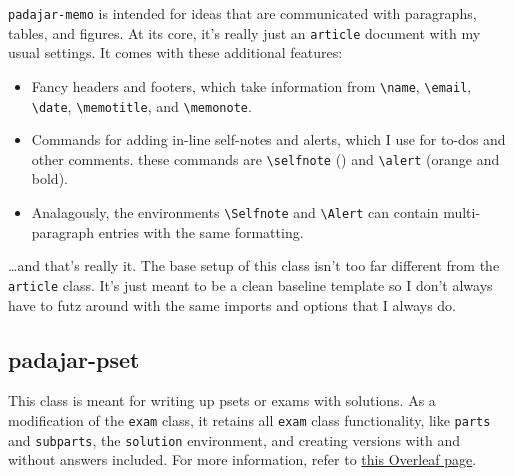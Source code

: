 \documentclass[11pt]{padajar-memo}
\newcommand{\ttslash}[1]{\texttt{\textbackslash #1}}
\begin{document}
\texttt{padajar-memo} is intended for ideas that are communicated with paragraphs, tables, and figures. At its core, it's really just an \texttt{article} document with my usual settings. It comes with these additional features:

\begin{itemize}
	\item Fancy headers and footers, which take information from \ttslash{name}, \ttslash{email}, \ttslash{date}, \ttslash{memotitle}, and \ttslash{memonote}.
	\item Commands for adding in-line self-notes and alerts, which I use for to-dos and other comments. these commands are \ttslash{selfnote} () and \ttslash{alert} (\alert{orange and bold}).
	\item Analagously, the environments \ttslash{Selfnote} and \ttslash{Alert} can contain multi-paragraph entries with the same formatting.
\end{itemize}

\dots and that's really it. The base setup of this class isn't too far different from the \texttt{article} class. It's just meant to be a clean baseline template so I don't always have to futz around with the same imports and options that I always do.

\subsection{padajar-pset}
This class is meant for writing up psets or exams with solutions. As a modification of the \texttt{exam} class, it retains all \texttt{exam} class functionality, like \texttt{parts} and \texttt{subparts}, the \texttt{solution} environment, and creating versions with and without answers included. For more information, refer to \href{https://www.overleaf.com/learn/latex/Typesetting\_exams\_in\_LaTeX}{this Overleaf page}.
\end{document}
